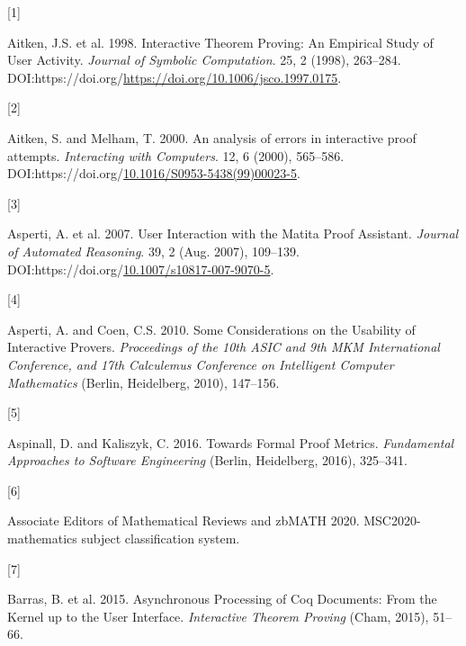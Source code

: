 \documentclass[
]{article}
\newlength{\cslhangindent}
\newlength{\csllabelwidth}
\newlength{\cslentryspacingunit} %
\newenvironment{CSLReferences}[2] %
 {%
  \setlength{\parindent}{0pt}
  \ifodd #1
  \let\oldpar\par
  \def\par{\hangindent=\cslhangindent\oldpar}
  \fi
  \setlength{\parskip}{#2\cslentryspacingunit}
 }%
 {}
\newcommand{\CSLLeftMargin}[1]{\parbox[t]{\csllabelwidth}{#1}}
\newcommand{\CSLRightInline}[1]{\parbox[t]{\linewidth - \csllabelwidth}{#1}\break}
\begin{document}
\hypertarget{refs}{}
\begin{CSLReferences}{0}{0}
\leavevmode{}%
\CSLLeftMargin{{[}1{]} }
\CSLRightInline{Aitken, J.S. et al. 1998. Interactive {Theorem}
{Proving}: {An} {Empirical} {Study} of {User} {Activity}. \emph{Journal
of Symbolic Computation}. 25, 2 (1998), 263--284.
DOI:https://doi.org/\url{https://doi.org/10.1006/jsco.1997.0175}.}

\leavevmode{}%
\CSLLeftMargin{{[}2{]} }
\CSLRightInline{Aitken, S. and Melham, T. 2000. An analysis of errors in
interactive proof attempts. \emph{Interacting with Computers}. 12, 6
(2000), 565--586.
DOI:https://doi.org/\href{https://doi.org/10.1016/S0953-5438(99)00023-5}{10.1016/S0953-5438(99)00023-5}.}

\leavevmode{}%
\CSLLeftMargin{{[}3{]} }
\CSLRightInline{Asperti, A. et al. 2007. User {Interaction} with the
{Matita} {Proof} {Assistant}. \emph{Journal of Automated Reasoning}. 39,
2 (Aug. 2007), 109--139.
DOI:https://doi.org/\href{https://doi.org/10.1007/s10817-007-9070-5}{10.1007/s10817-007-9070-5}.}

\leavevmode{}%
\CSLLeftMargin{{[}4{]} }
\CSLRightInline{Asperti, A. and Coen, C.S. 2010. Some {Considerations}
on the {Usability} of {Interactive} {Provers}. \emph{Proceedings of the
10th {ASIC} and 9th {MKM} {International} {Conference}, and 17th
{Calculemus} {Conference} on {Intelligent} {Computer} {Mathematics}}
(Berlin, Heidelberg, 2010), 147--156.}

\leavevmode{}%
\CSLLeftMargin{{[}5{]} }
\CSLRightInline{Aspinall, D. and Kaliszyk, C. 2016. Towards {Formal}
{Proof} {Metrics}. \emph{Fundamental {Approaches} to {Software}
{Engineering}} (Berlin, Heidelberg, 2016), 325--341.}

\leavevmode{}%
\CSLLeftMargin{{[}6{]} }
\CSLRightInline{Associate Editors of Mathematical Reviews and zbMATH
2020. MSC2020-mathematics subject classification system.}

\leavevmode{}%
\CSLLeftMargin{{[}7{]} }
\CSLRightInline{Barras, B. et al. 2015. Asynchronous {Processing} of
{Coq} {Documents}: {From} the {Kernel} up to the {User} {Interface}.
\emph{Interactive {Theorem} {Proving}} (Cham, 2015), 51--66.}


\end{CSLReferences}
\end{document}
